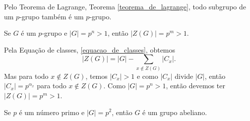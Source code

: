 \begin{observacao}
	Pelo Teorema de Lagrange, Teorema \ref{teorema_de_lagrange}, todo subgrupo de um $p$-grupo tamb\'em \'e um $p$-grupo.
\end{observacao}

\begin{teorema}
	Se $G$ \'e um $p$-grupo e $|G| = p^n > 1$, ent\~ao $|Z(G)| = p^m > 1$.
\end{teorema}
\begin{prova}
	Pela Equa\c{c}\~ao de classes, \eqref{equacao_de_classes}, obtemos
	\[
		|Z(G)| = |G| - \sum_{x \notin Z(G)}|C_x|.
	\]
	Mas para todo $x \notin Z(G)$, temos $|C_x| > 1$ e como $|C_x|$ divide $|G|$, ent\~ao $|C_x| = p^{\alpha_x}$ para todo $x \notin Z(G)$. Como $|G| = p^n > 1$, ent\~ao devemos ter $|Z(G)| = p^m > 1$.
\end{prova}

\begin{corolario}
	Se $p$ \'e um n\'umero primo e $|G| = p^2$, ent\~ao $G$ \'e um grupo abeliano.
\end{corolario}

